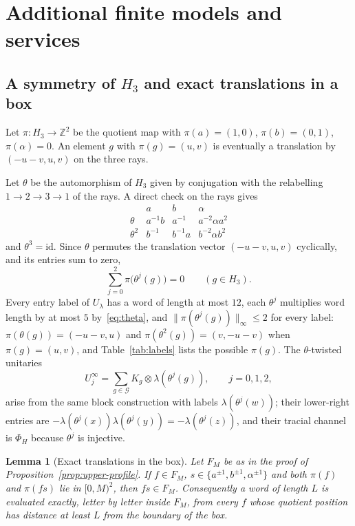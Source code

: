 \documentclass[11pt,a4paper]{article}
\theoremstyle{plain}
\newtheorem{lemma}[theorem]{Lemma}
\theoremstyle{definition}
\theoremstyle{remark}
\begin{document}
\section{Additional finite models and services}\label{app:alternative}


\subsection{A symmetry of $H_3$ and exact translations in a box}\label{sec:symmetry}

Let $\pi:H_3\to\mathbb Z^2$ be the quotient map with $\pi(a)=(1,0)$, $\pi(b)=(0,1)$, $\pi(\alpha)=0$. An element $g$ with
$\pi(g)=(u,v)$ is eventually a translation by $(-u-v,u,v)$ on the three rays.

Let $\theta$ be the automorphism of $H_3$ given by conjugation with the relabelling $1\to2\to3\to1$ of the rays. A direct
check on the rays gives
\begin{equation}\label{eq:theta}
\begin{array}{c|ccc}
 &a&b&\alpha\\ \hline
\theta&a^{-1}b&a^{-1}&a^{-2}\alpha a^2\\
\theta^2&b^{-1}&b^{-1}a&b^{-2}\alpha b^2
\end{array}
\end{equation}
and $\theta^3=\mathrm{id}$. Since $\theta$ permutes the translation vector $(-u-v,u,v)$ cyclically, and its entries sum to zero,
\begin{equation}\label{eq:drift}
\sum_{j=0}^{2}\pi\big(\theta^j(g)\big)=0\qquad(g\in H_3).
\end{equation}
Every entry label of $U_\lambda$ has a word of length at most $12$, each $\theta^j$ multiplies word length by at most $5$
by~\eqref{eq:theta}, and $\|\pi(\theta^j(g))\|_\infty\le2$ for every label: $\pi(\theta(g))=(-u-v,u)$ and
$\pi(\theta^2(g))=(v,-u-v)$ when $\pi(g)=(u,v)$, and Table~\ref{tab:labels} lists the possible $\pi(g)$. The $\theta$-twisted unitaries
\[
U_j^\infty=\sum_{g\in\mathcal G}K_g\otimes\lambda(\theta^j(g)),\qquad j=0,1,2,
\]
arise from the same block construction with labels $\lambda(\theta^j(w))$; their lower-right entries are
$-\lambda(\theta^j(x))\lambda(\theta^j(y))=-\lambda(\theta^j(z))$, and their tracial channel is $\Phi_H$ because $\theta^j$ is injective.

\begin{lemma}[Exact translations in the box]\label{lem:box}
Let $F_M$ be as in the proof of Proposition~\ref{prop:upper-profile}. If $f\in F_M$, $s\in\{a^{\pm1},b^{\pm1},\alpha^{\pm1}\}$
and both $\pi(f)$ and $\pi(fs)$ lie in $[0,M)^2$, then $fs\in F_M$. Consequently a word of length $L$ is evaluated
exactly, letter by letter inside $F_M$, from every $f$ whose quotient position has distance at least $L$ from the boundary of
the box.
\end{lemma}
\end{document}
